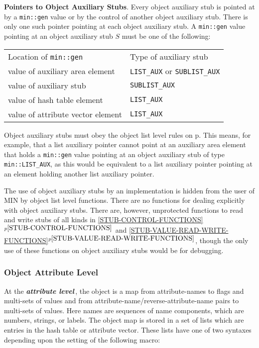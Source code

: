 \documentclass[12pt]{article}
\newcommand{\key}[1]{{\bf \em #1}\index{#1}}
\newcommand{\itemref}[1]{\ref{#1}$^{p\pageref{#1}}$}
\newcommand{\pagref}[1]{p\pageref{#1}}
\newenvironment{indpar}[1][0.3in]%
	{\begin{list}{}%
		     {\setlength{\itemsep}{0in}%
		      \setlength{\topsep}{0in}%
		      \setlength{\parsep}{1ex}%
		      \setlength{\labelwidth}{#1}%
		      \setlength{\leftmargin}{#1}%
		      \addtolength{\leftmargin}{\labelsep}}%
	 \item}%
	{\end{list}}
\begin{document}
\begin{indpar}
{\bf Pointers to Object Auxiliary Stubs}.%
Every object auxiliary stub is pointed at by a \verb|min::gen|
value or by the control of another object auxiliary stub.  There is
only one such pointer pointing at each object auxiliary stub.
A \verb|min::gen| value pointing at an object auxiliary stub $S$
must be one of the following:
\begin{center}
\begin{tabular}{l@{~~~}l}
Location of \verb|min::gen| & Type of auxiliary stub
\\[2ex]
value of auxiliary area element & \verb|LIST_AUX| or \verb|SUBLIST_AUX|
\\[1ex]
value of auxiliary stub & \verb|SUBLIST_AUX|
\\[1ex]
value of hash table element & \verb|LIST_AUX|
\\[1ex]
value of attribute vector element & \verb|LIST_AUX|
\end{tabular}
\end{center}

\end{indpar}

Object auxiliary stubs
must obey the object list level rules on \pagref{NO-SUPERFLUOUS-LIST}.
This means, for example, that a list auxiliary pointer cannot point
at an auxiliary area element that holds a \verb|min::gen| value
pointing at an object auxiliary stub of type \verb|min::LIST_AUX|,
as this would be equivalent to a list auxiliary pointer pointing at an
element holding another list auxiliary pointer.

The use of object auxiliary stubs by an implementation is hidden from
the user of MIN by object list level functions.  There are no functions
for dealing explicitly with object auxiliary stubs.  There are, however,
unprotected functions to read and write stubs of all kinds in
\itemref{STUB-CONTROL-FUNCTIONS} and
\itemref{STUB-VALUE-READ-WRITE-FUNCTIONS},
though the only use of these functions on
object auxiliary stubs would be for debugging.

\subsubsection{Object Attribute Level}
\label{OBJECT-ATTRIBUTE-LEVEL}

At the \key{attribute level}\,, the object is a map from attribute-names to
flags and multi-sets of values and from attribute-name/reverse-attribute-name
pairs to multi-sets of values.
Here names are sequences of name components, which are
numbers, strings, or labels.  The object map is stored in a set of lists which
are entries in the hash table or attribute vector.  These lists have
one of two syntaxes depending upon the setting of the following macro:
\end{document}

